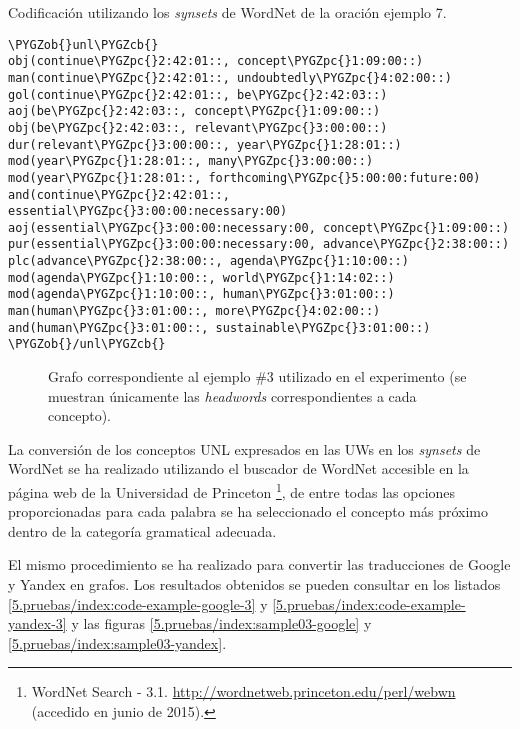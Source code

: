 \documentclass[a4paper,12pt,spanish]{book}
\def\PYGZob{\char`\{}
\def\PYGZcb{\char`\}}
\def\PYGZpc{\char`\%}
\begin{document}
\begin{literal-block}
\caption{Codificación utilizando los \emph{synsets} de WordNet de la oración ejemplo 7.}
\begin{Verbatim}[commandchars=\\\{\}]
\PYGZob{}unl\PYGZcb{}
obj(continue\PYGZpc{}2:42:01::, concept\PYGZpc{}1:09:00::)
man(continue\PYGZpc{}2:42:01::, undoubtedly\PYGZpc{}4:02:00::)
gol(continue\PYGZpc{}2:42:01::, be\PYGZpc{}2:42:03::)
aoj(be\PYGZpc{}2:42:03::, concept\PYGZpc{}1:09:00::)
obj(be\PYGZpc{}2:42:03::, relevant\PYGZpc{}3:00:00::)
dur(relevant\PYGZpc{}3:00:00::, year\PYGZpc{}1:28:01::)
mod(year\PYGZpc{}1:28:01::, many\PYGZpc{}3:00:00::)
mod(year\PYGZpc{}1:28:01::, forthcoming\PYGZpc{}5:00:00:future:00)
and(continue\PYGZpc{}2:42:01::, essential\PYGZpc{}3:00:00:necessary:00)
aoj(essential\PYGZpc{}3:00:00:necessary:00, concept\PYGZpc{}1:09:00::)
pur(essential\PYGZpc{}3:00:00:necessary:00, advance\PYGZpc{}2:38:00::)
plc(advance\PYGZpc{}2:38:00::, agenda\PYGZpc{}1:10:00::)
mod(agenda\PYGZpc{}1:10:00::, world\PYGZpc{}1:14:02::)
mod(agenda\PYGZpc{}1:10:00::, human\PYGZpc{}3:01:00::)
man(human\PYGZpc{}3:01:00::, more\PYGZpc{}4:02:00::)
and(human\PYGZpc{}3:01:00::, sustainable\PYGZpc{}3:01:00::)
\PYGZob{}/unl\PYGZcb{}
\end{Verbatim}
\label{5.pruebas/index:code-example-original-3}
\end{literal-block}
\begin{figure}[htbp]
\centering
\capstart

\caption[Grafo correspondiente al ejemplo \#3 utilizado en el experimento.]{Grafo correspondiente al ejemplo \#3 utilizado en el experimento (se muestran
únicamente las \emph{headwords} correspondientes a cada concepto).}\label{5.pruebas/index:sample03-original}\end{figure}

La conversión de los conceptos UNL expresados en las UWs en los \emph{synsets} de WordNet
se ha realizado utilizando el buscador de WordNet accesible en la página web de la Universidad
de Princeton \footnote{
WordNet Search - 3.1. \href{http://wordnetweb.princeton.edu/perl/webwn}{http://wordnetweb.princeton.edu/perl/webwn} (accedido en
junio de 2015).
}, de entre todas las opciones proporcionadas para cada palabra se
ha seleccionado el concepto más próximo dentro de la categoría gramatical adecuada.

El mismo procedimiento se ha realizado para convertir las traducciones de Google y
Yandex en grafos. Los resultados obtenidos se pueden consultar en los listados
\hyperref[5.pruebas/index:code-example-google-3]{ \ref*{5.pruebas/index:code-example-google-3}} y \hyperref[5.pruebas/index:code-example-yandex-3]{ \ref*{5.pruebas/index:code-example-yandex-3}} y las figuras
\hyperref[5.pruebas/index:sample03-google]{ \ref*{5.pruebas/index:sample03-google}} y \hyperref[5.pruebas/index:sample03-yandex]{ \ref*{5.pruebas/index:sample03-yandex}}.
\end{document}
